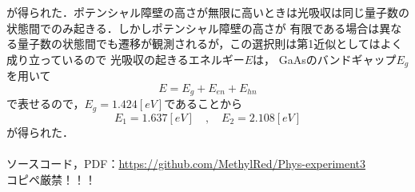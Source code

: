 \documentclass[a4paper,11pt,titlepage]{jsarticle}
\begin{document}
が得られた．ポテンシャル障壁の高さが無限に高いときは光吸収は同じ量子数の状態間でのみ起きる．しかしポテンシャル障壁の高さが
有限である場合は異なる量子数の状態間でも遷移が観測されるが，この選択則は第1近似としてはよく成り立っているので
光吸収の起きるエネルギー$E$は，
GaAsのバンドギャップ$E_g$を用いて
\begin{equation}
    E = E_g + E_{en} + E_{hn}
\end{equation}
で表せるので，$E_g = 1.424[eV]$であることから
\begin{equation}
    E_1 = 1.637[eV]\quad , \quad E_2 = 2.108[eV]
\end{equation}
が得られた．\\
\\
\noindent ソースコード，PDF：\url{https://github.com/MethylRed/Phys-experiment3}\\
コピペ厳禁！！！
\end{document}
